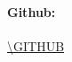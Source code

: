 


\renewcommand\Authands{ und }
\title{\TITLE}
\subject{\SUBJECT}
\author{\SECONDAUTHOR}
\author{\THIRDAUTHOR}
\author{\FOURTHAUTHOR}
\author{\AUTHOR}
\affil{\INSTITUTE}
\affil{\LECTURER}
\date{\today}
\maketitle

\begin{center}
\end{center}

\vfill

\paragraph{Github:} \url{\GITHUB}

\tableofcontents

\printglossary[type=\acronymtype]
\printglossary
\glsaddall
